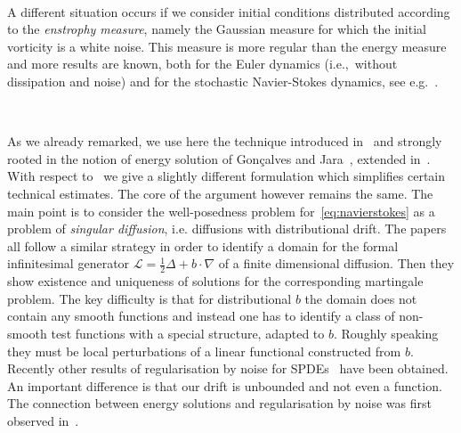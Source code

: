 \documentclass[10pt]{article}
\newcommand{\tmem}[1]{{\em #1\/}}
\newcommand{\tmtextit}[1]{{\itshape{#1}}}
\begin{document}
\

A different situation occurs if we consider initial conditions distributed
according to the \tmtextit{enstrophy measure}, namely the Gaussian measure for
which the initial vorticity is a white noise. This measure is more regular
than the energy measure and more results are known, both for the Euler
dynamics (i.e.,~without dissipation and noise) and for the stochastic
Navier-Stokes dynamics, see
e.g.~{\cite{albeverio1990global,albeverio2004uniqueness,albeverio2008some}}.

\

As we already remarked, we use here the technique introduced
in~{\cite{gubinelli2018infinitesimal}} and strongly rooted in the notion of
energy solution of Gon{\c c}alves and Jara~{\cite{Goncalves2014}}, extended
in~{\cite{gubinelli2013regularization}}. With respect
to~{\cite{gubinelli2018infinitesimal}} we give a slightly different
formulation which simplifies certain technical estimates. The core of the
argument however remains the same. The main point is to consider the
well-posedness problem for~{\eqref{eq:navierstokes}} as a problem of
{\tmem{singular diffusion}}, i.e. diffusions with distributional drift. The
papers~{\cite{Flandoli2003,Flandoli2004,Delarue2016,Cannizzaro2018}} all
follow a similar strategy in order to identify a domain for the formal
infinitesimal generator $\mathcal{L}= \tfrac{1}{2} \Delta + b \cdot \nabla$ of
a finite dimensional diffusion. Then they show existence and uniqueness of
solutions for the corresponding martingale problem. The key difficulty is that
for distributional $b$ the domain does not contain any smooth functions and
instead one has to identify a class of non-smooth test functions with a
special structure, adapted to $b$. Roughly speaking they must be local
perturbations of a linear functional constructed from $b$. Recently other
results of regularisation by noise for SPDEs~{\cite{DaPrato2013,DaPrato2016}}
have been obtained. An important difference is that our drift is unbounded and
not even a function. The connection between energy solutions and
regularisation by noise was first observed
in~{\cite{gubinelli2013regularization}}.
\end{document}
